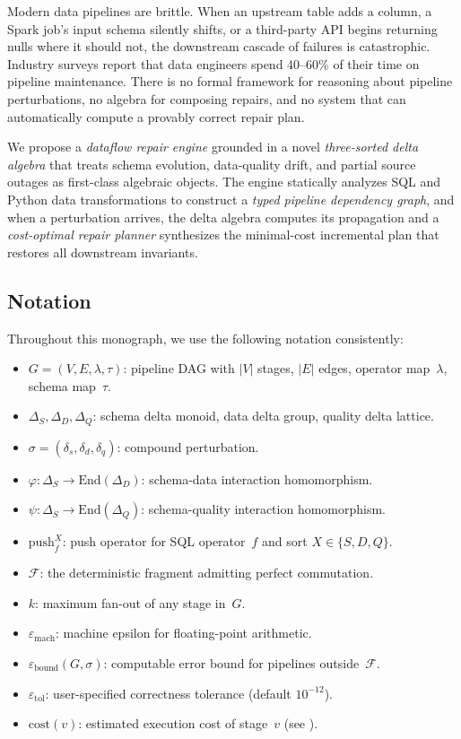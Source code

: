 \documentclass[11pt,a4paper]{article}
\theoremstyle{definition}
\newcommand{\DeltaS}{\Delta_{\!S}}
\newcommand{\DeltaD}{\Delta_{\!D}}
\newcommand{\DeltaQ}{\Delta_{\!Q}}
\newcommand{\push}{\mathrm{push}}
\newcommand{\cost}{\mathrm{cost}}
\newcommand{\FragF}{\mathcal{F}}
\newcommand{\emach}{\varepsilon_{\mathrm{mach}}}
\newcommand{\ebound}{\varepsilon_{\mathrm{bound}}}
\newcommand{\etol}{\varepsilon_{\mathrm{tol}}}
\begin{document}
Modern data pipelines are brittle.  When an upstream table adds a column, a
Spark job's input schema silently shifts, or a third-party API begins returning
nulls where it should not, the downstream cascade of failures is catastrophic.
Industry surveys report that data engineers spend 40--60\% of their time on
pipeline maintenance.  There is no formal framework for reasoning about pipeline
perturbations, no algebra for composing repairs, and no system that can
automatically compute a provably correct repair plan.

We propose a \emph{dataflow repair engine} grounded in a novel
\emph{three-sorted delta algebra} that treats schema evolution, data-quality
drift, and partial source outages as first-class algebraic objects.  The engine
statically analyzes SQL and Python data transformations to construct a
\emph{typed pipeline dependency graph}, and when a perturbation arrives, the
delta algebra computes its propagation and a \emph{cost-optimal repair planner}
synthesizes the minimal-cost incremental plan that restores all downstream
invariants.

\subsection{Notation}
\label{sec:notation}

Throughout this monograph, we use the following notation consistently:
\begin{itemize}[nosep]
  \item $G = (V, E, \lambda, \tau)$: pipeline DAG with $|V|$ stages,
        $|E|$ edges, operator map~$\lambda$, schema map~$\tau$.
  \item $\DeltaS, \DeltaD, \DeltaQ$: schema delta monoid, data delta group,
        quality delta lattice.
  \item $\sigma = (\delta_s, \delta_d, \delta_q)$: compound perturbation.
  \item $\varphi\colon \DeltaS \to \mathrm{End}(\DeltaD)$: schema-data
        interaction homomorphism.
  \item $\psi\colon \DeltaS \to \mathrm{End}(\DeltaQ)$: schema-quality
        interaction homomorphism.
  \item $\push_f^X$: push operator for SQL operator~$f$ and sort
        $X \in \{S, D, Q\}$.
  \item $\FragF$: the deterministic fragment admitting perfect commutation.
  \item $k$: maximum fan-out of any stage in~$G$.
  \item $\emach$: machine epsilon for floating-point arithmetic.
  \item $\ebound(G, \sigma)$: computable error bound for pipelines outside~$\FragF$.
  \item $\etol$: user-specified correctness tolerance (default $10^{-12}$).
  \item $\cost(v)$: estimated execution cost of stage~$v$ (see
        ).
\end{itemize}
\end{document}
